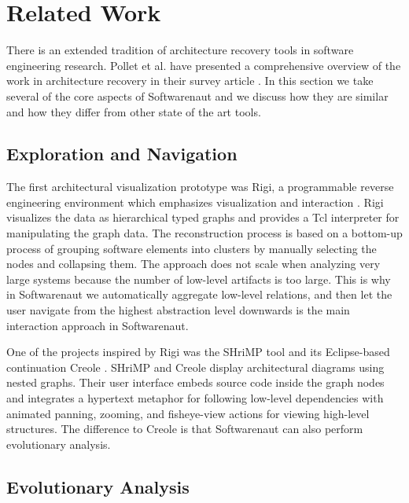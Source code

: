 \documentclass[preprint,12pt]{elsarticle}
\begin{document}
\section {Related Work} \label {sec:rel}

There is an extended tradition of architecture recovery tools in software engineering research. Pollet et al. have presented a comprehensive overview of the work in architecture recovery in their survey article \cite{pollet-sar}. In this section we take several of the core aspects of Softwarenaut and we discuss how they are similar and how they differ from other state of the art tools.

\subsection {Exploration and Navigation} 

The first architectural visualization prototype was Rigi, a programmable reverse engineering environment which emphasizes visualization and interaction \cite{muller-revengenv}. Rigi  visualizes the data as hierarchical typed graphs and provides a Tcl interpreter for manipulating the graph data. The reconstruction process is based on a bottom-up process of grouping  software elements into clusters by manually selecting the nodes and collapsing them. The approach does not scale when analyzing very large systems because the number of low-level artifacts is too large. This is why in Softwarenaut we automatically aggregate low-level relations, and then let the user navigate from the highest abstraction level downwards is the main interaction approach in Softwarenaut. 

One of the projects inspired by Rigi was the SHriMP tool \cite{storey-shrimp} and its Eclipse-based continuation Creole \cite{lintern-creole}. SHriMP and Creole display architectural diagrams using nested graphs. Their user interface embeds source code inside the graph nodes and integrates a hypertext metaphor for following low-level dependencies with animated panning, zooming, and fisheye-view actions for viewing high-level structures. The difference to Creole is that Softwarenaut can also perform evolutionary analysis.


\subsection {Evolutionary Analysis}
 
\end{document}
